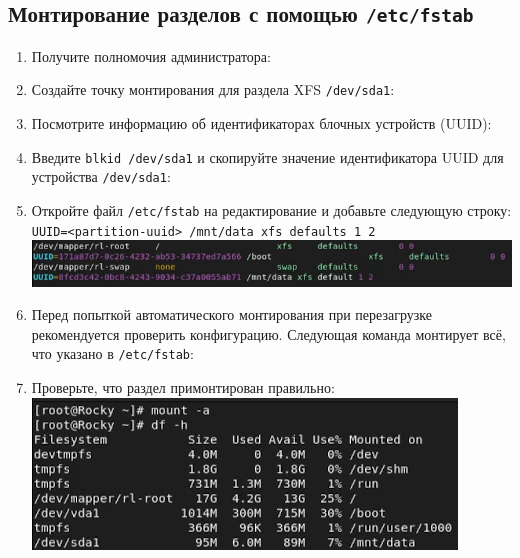 \documentclass[12pt]{article}
\begin{document}
\subsection{Монтирование разделов с помощью \texttt{/etc/fstab}}
\begin{enumerate}
	\item Получите полномочия администратора:
	\item Создайте точку монтирования для раздела XFS \texttt{/dev/sda1}:
	\item Посмотрите информацию об идентификаторах блочных устройств (UUID):
	\item Введите \texttt{blkid /dev/sda1} и скопируйте значение идентификатора UUID для устройства \texttt{/dev/sda1}:
	\item Откройте файл \texttt{/etc/fstab} на редактирование и добавьте следующую строку:
	      \texttt{UUID=<partition-uuid> /mnt/data xfs defaults 1 2}
	      \\\includegraphics{11.png}
	\item Перед попыткой автоматического монтирования при перезагрузке рекомендуется проверить конфигурацию.
	      Следующая команда монтирует всё, что указано в \texttt{/etc/fstab}:
	\item Проверьте, что раздел примонтирован правильно:
	      \\\includegraphics{12.png}
\end{enumerate}
\end{document}

